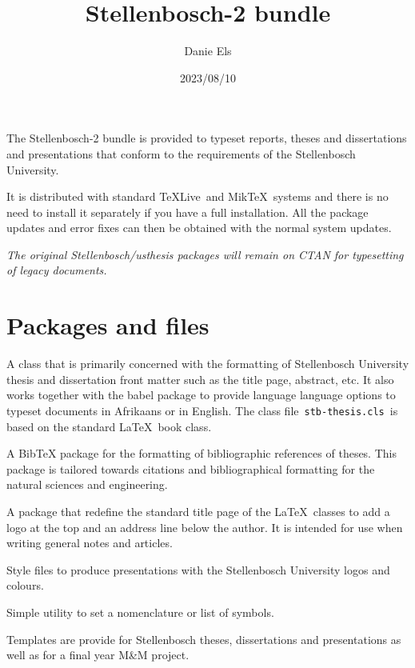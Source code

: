 \documentclass[10pt,a4paper]{article}
\title{Stellenbosch-2 bundle}
\author{Danie Els}
\date{2023/08/10}
\newlength{\tdima}
\newenvironment{fminipage}[1][\linewidth]
    {\setlength{\tdima}{#1-2\fboxsep-2\fboxrule}%
     \begin{lrbox}{\tboxa}\begin{minipage}{\tdima}}%
    {\end{minipage}\end{lrbox}\noindent\fbox{\usebox{\tboxa}}}
\newenvironment{Cpara}[1][\normalsize]
    {\list{}{\setlength{\leftmargin}{0pt}%
             \setlength{\labelwidth}{0pt}%
             \setlength{\labelsep}{0pt}}%
     \item\relax\cminipage\small#1\ignorespaces}%
    {\endcminipage\endlist}
\newcommand*\file[1]{\,\texttt{#1}\,}%
\newcommand*\prgm[1]{\textsf{#1}}
\newcommand\TL{\prgm{\TeX{}Live}}
\newcommand\MT{\prgm{Mik\TeX}}
\newcommand\pkg[1]{\textsf{#1}}
\begin{document}
\maketitle 

\noindent\begin{fminipage}
\begin{Cpara}
The Stellenbosch-2 bundle is provided to typeset reports, theses and
dissertations and presentations that conform to the requirements of the Stellenbosch
University.\medskip

It is distributed with standard \TL\ and \MT\
systems and there is no need to install it separately if you have a full
installation. All the package updates and error fixes can then be obtained
with the normal system updates.\medskip

\emph{The original Stellenbosch/usthesis packages will remain on CTAN for typesetting of legacy documents.}
\end{Cpara}
\end{fminipage}\smallskip


\section*{Packages and files}

\begin{description}[style=nextline]
    \item[\pkg{stb-thesis}:] A class that is primarily concerned with the
        formatting of Stellenbosch University thesis and dissertation front matter such as the title page, abstract, etc. It also works together with the babel package
        to provide language language options to typeset documents in
        Afrikaans or in English. The class file \file{stb-thesis.cls} is based on the standard \LaTeX\ book class.

    \item[\pkg{stb-bib}:]  A  \prgm{Bib\TeX} package for the formatting of
        bibliographic references of theses. This package is tailored
        towards citations and bibliographical formatting for the natural
        sciences and engineering.

    \item[\pkg{stb-titlepage}:]  A package that redefine the standard title page of the
        \LaTeX\ classes to add a logo at the top and an address line below
        the author. It is intended for use when writing general notes and
        articles.

    \item[\pkg{stb-beamer}:]  Style files to produce presentations with the Stellenbosch University logos and colours.
   
    \item[\pkg{stb-nomencl}:]  Simple utility to set a nomenclature or list of
        symbols.

    \item[\texttt{templates}:] Templates are provide for Stellenbosch theses, dissertations and presentations as well as for a final year M\&M project. 
\end{description}
\end{document}
